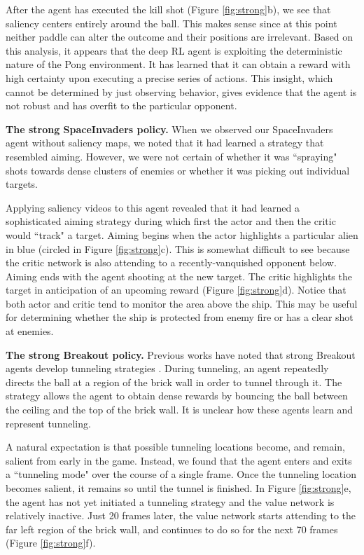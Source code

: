\documentclass{article}
\begin{document}
After the agent has executed the kill shot (Figure \ref{fig:strong}b), we see that saliency centers entirely around the ball. This makes sense since at this point neither paddle can alter the outcome and their positions are irrelevant. Based on this analysis, it appears that the deep RL agent is exploiting the deterministic nature of the Pong environment. It has learned that it can obtain a reward with high certainty upon executing a precise series of actions. This insight, which cannot be determined by just observing behavior, gives evidence that the agent is not robust and has overfit to the particular opponent. 

\textbf{The strong SpaceInvaders policy.} When we observed our SpaceInvaders agent without saliency maps, we noted that it had learned a strategy that resembled aiming. However, we were not certain of whether it was ``spraying" shots towards dense clusters of enemies or whether it was picking out individual targets.

Applying saliency videos to this agent revealed that it had learned a sophisticated aiming strategy during which first the actor and then the critic would ``track" a target. Aiming begins when the actor highlights a particular alien in blue (circled in Figure \ref{fig:strong}c). This is somewhat difficult to see because the critic network is also attending to a recently-vanquished opponent below. Aiming ends with the agent shooting at the new target. The critic highlights the target in anticipation of an upcoming reward (Figure \ref{fig:strong}d). Notice that both actor and critic tend to monitor the area above the ship. This may be useful for determining whether the ship is protected from enemy fire or has a clear shot at enemies.


\textbf{The strong Breakout policy.} Previous works have noted that strong Breakout agents develop tunneling strategies \cite{Mnih2015Human-levelLearning, Zahavy2016GrayingDQNs}. During tunneling, an agent repeatedly directs the ball at a region of the brick wall in order to tunnel through it. The strategy allows the agent to obtain dense rewards by bouncing the ball between the ceiling and the top of the brick wall. It is unclear how these agents learn and represent tunneling.

A natural expectation is that possible tunneling locations become, and remain, salient from early in the game. Instead, we found that the agent enters and exits a ``tunneling mode" over the course of a single frame. Once the tunneling location becomes salient, it remains so until the tunnel is finished. In Figure \ref{fig:strong}e, the agent has not yet initiated a tunneling strategy and the value network is relatively inactive. Just 20 frames later, the value network starts attending to the far left region of the brick wall, and continues to do so for the next 70 frames (Figure \ref{fig:strong}f).
\end{document}
